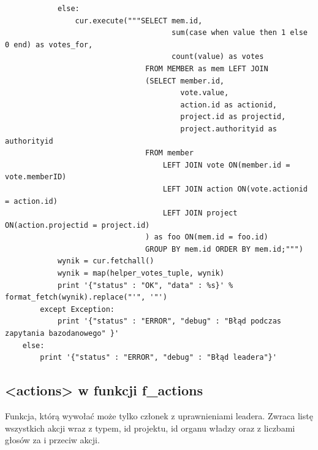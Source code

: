 \documentclass{article}
\begin{document}
\begin{verbatim}
            else:
                cur.execute("""SELECT mem.id,
                                      sum(case when value then 1 else 0 end) as votes_for,
                                      count(value) as votes 
                                FROM MEMBER as mem LEFT JOIN
                                (SELECT member.id,
                                        vote.value,
                                        action.id as actionid, 
                                        project.id as projectid, 
                                        project.authorityid as authorityid
                                FROM member
                                    LEFT JOIN vote ON(member.id = vote.memberID)
                                    LEFT JOIN action ON(vote.actionid = action.id)
                                    LEFT JOIN project ON(action.projectid = project.id)
                                ) as foo ON(mem.id = foo.id)
                                GROUP BY mem.id ORDER BY mem.id;""")
            wynik = cur.fetchall()
            wynik = map(helper_votes_tuple, wynik)
            print '{"status" : "OK", "data" : %s}' % format_fetch(wynik).replace("'", '"')  
        except Exception:  
            print '{"status" : "ERROR", "debug" : "Błąd podczas zapytania bazodanowego" }' 
    else:
        print '{"status" : "ERROR", "debug" : "Błąd leadera"}'   
\end{verbatim}












\newpage
\subsection{<actions> w funkcji f\_actions }
Funkcja, którą wywołać może tylko członek z uprawnieniami leadera. Zwraca listę wszystkich akcji wraz z typem, id projektu, id organu władzy oraz z liczbami głosów za i przeciw akcji.
\end{document}
